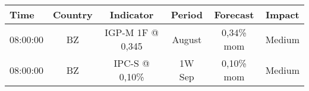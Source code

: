 \documentclass[article,crop=false]{standalone}%
\begin{document}
%
\normalsize%
\setlength{\tabcolsep}{0.15cm}%
\begin{tabular}[h]{l | c c c c c}%
\hline%
\rowcolor{white}%
\textbf{Time}&\textbf{Country}&\textbf{Indicator}&\textbf{Period}&\textbf{Forecast}&\textbf{Impact}\\%
\hline%
\rowcolor{lightgray}%
08:00:00&BZ&IGP{-}M 1F @ 0,345&August&0,34\% mom&Medium\\%
\rowcolor{white}%
08:00:00&BZ&IPC{-}S @ 0,10\%&1W Sep&0,10\% mom&Medium\\%
\hline%
\end{tabular}%
\end{document}
